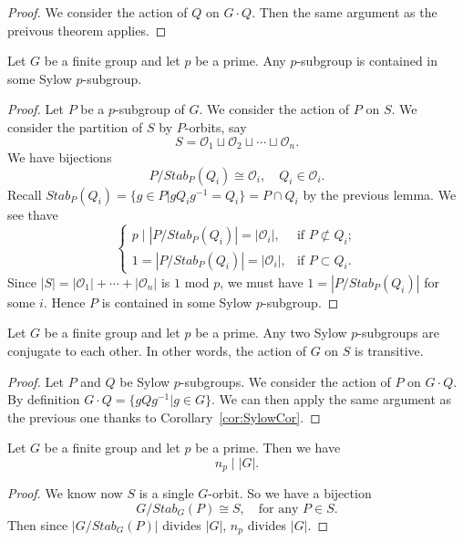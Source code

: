 \begin{proof}
    We consider the action of $Q$ on $G\cdot Q$. Then the same argument as the preivous theorem applies.
\end{proof}


\begin{thm}
    Let $G$ be a finite group and let $p$ be a prime. Any $p$-subgroup is contained in some Sylow $p$-subgroup.
\end{thm}
\begin{proof}
    Let $P$ be a $p$-subgroup of $G$. We consider the action of $P$ on $S$. We consider the partition of $S$ by $P$-orbits, say
    \[
        S = \mathcal{O}_1 \sqcup \mathcal{O}_2 \sqcup \cdots \sqcup \mathcal{O}_n.
    \]
    We have bijections
    \[
        P/ Stab_P(Q_i) \cong \mathcal{O}_i, \quad Q_i \in \mathcal{O}_i.
    \]
    Recall $Stab_P(Q_i) = \{g \in P \vert g Q_ig^{-1} = Q_i\} = P \cap Q_i$ by the previous lemma. We see thave
    \[
        \begin{cases}
            p \mid |P/ Stab_P(Q_i)|= |\mathcal{O}_i|, & \text{if } P \not \subset Q_i; \\
            1 =|P/ Stab_P(Q_i)|= |\mathcal{O}_i|,     & \text{if } P \subset Q_i.
        \end{cases}
    \]
    Since $|S| = |\mathcal{O}_1| + \cdots + |\mathcal{O}_n|$ is $1$ mod $p$, we must have $ 1 =|P/ Stab_P(Q_i)|$ for some $i$. Hence $P$ is contained in some Sylow $p$-subgroup.
\end{proof}

\begin{thm}
    Let $G$ be a finite group and let $p$ be a prime. Any two Sylow $p$-subgroups are conjugate to each other. In other words, the action of $G$ on $S$ is transitive.
\end{thm}
\begin{proof}
    Let $P$ and $Q$ be Sylow $p$-subgroups. We consider the action of $P$ on $G\cdot Q$. By definition $G\cdot  Q = \{gQg^{-1}\vert g \in G\}$. We can then apply the same argument as the previous one thanks to Corollary~\ref{cor:SylowCor}.
\end{proof}

\begin{thm}
    Let $G$ be a finite group and let $p$ be a prime. Then we have
    \[
        n_p \mid |G|.
    \]
\end{thm}
\begin{proof}
    We know now $S$ is a single $G$-orbit. So we have a bijection
    \[
        G/Stab_G(P) \cong S, \quad\text{for any } P \in S.
    \]
    Then since $|G/Stab_G(P)|$ divides $|G|$, $n_p$ divides $|G|$.
\end{proof}


